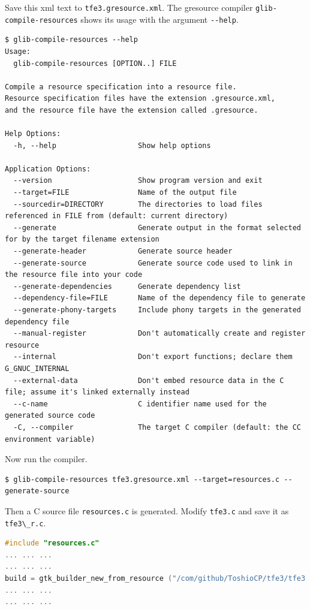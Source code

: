 Save this xml text to \passthrough{\lstinline!tfe3.gresource.xml!}. The
gresource compiler \passthrough{\lstinline!glib-compile-resources!}
shows its usage with the argument \passthrough{\lstinline!--help!}.

\begin{lstlisting}
$ glib-compile-resources --help
Usage:
  glib-compile-resources [OPTION..] FILE

Compile a resource specification into a resource file.
Resource specification files have the extension .gresource.xml,
and the resource file have the extension called .gresource.

Help Options:
  -h, --help                   Show help options

Application Options:
  --version                    Show program version and exit
  --target=FILE                Name of the output file
  --sourcedir=DIRECTORY        The directories to load files referenced in FILE from (default: current directory)
  --generate                   Generate output in the format selected for by the target filename extension
  --generate-header            Generate source header
  --generate-source            Generate source code used to link in the resource file into your code
  --generate-dependencies      Generate dependency list
  --dependency-file=FILE       Name of the dependency file to generate
  --generate-phony-targets     Include phony targets in the generated dependency file
  --manual-register            Don't automatically create and register resource
  --internal                   Don't export functions; declare them G_GNUC_INTERNAL
  --external-data              Don't embed resource data in the C file; assume it's linked externally instead
  --c-name                     C identifier name used for the generated source code
  -C, --compiler               The target C compiler (default: the CC environment variable)
\end{lstlisting}

Now run the compiler.

\begin{lstlisting}
$ glib-compile-resources tfe3.gresource.xml --target=resources.c --generate-source
\end{lstlisting}

Then a C source file \passthrough{\lstinline!resources.c!} is generated.
Modify \passthrough{\lstinline!tfe3.c!} and save it as
\passthrough{\lstinline!tfe3\_r.c!}.

\begin{lstlisting}[language=C]
#include "resources.c"
... ... ...
... ... ...
build = gtk_builder_new_from_resource ("/com/github/ToshioCP/tfe3/tfe3.ui");
... ... ...
... ... ...
\end{lstlisting}

